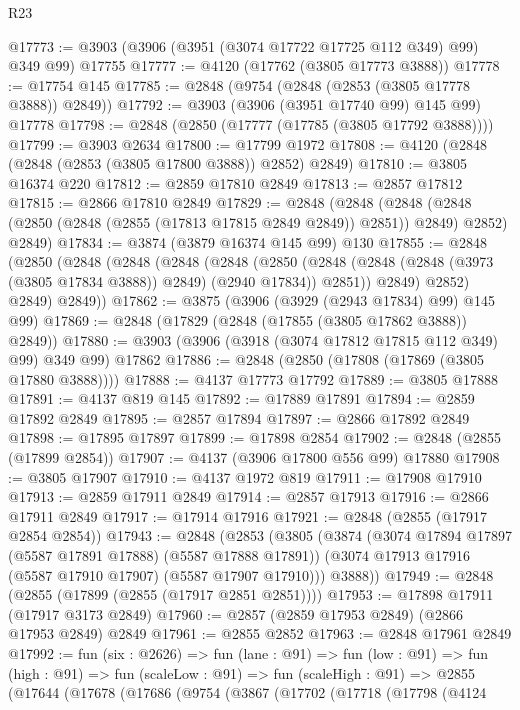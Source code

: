\begin{lexlean}{R23}
\begin{coremodule}
@17773 := @3903 (@3906 (@3951 (@3074 @17722 @17725 @112 @349) @99) @349 @99) @17755
@17777 := @4120 (@17762 (@3805 @17773 @3888))
@17778 := @17754 @145
@17785 := @2848 (@9754 (@2848 (@2853 (@3805 @17778 @3888)) @2849))
@17792 := @3903 (@3906 (@3951 @17740 @99) @145 @99) @17778
@17798 := @2848 (@2850 (@17777 (@17785 (@3805 @17792 @3888))))
@17799 := @3903 @2634
@17800 := @17799 @1972
@17808 := @4120 (@2848 (@2848 (@2853 (@3805 @17800 @3888)) @2852) @2849)
@17810 := @3805 @16374 @220
@17812 := @2859 @17810 @2849
@17813 := @2857 @17812
@17815 := @2866 @17810 @2849
@17829 := @2848
    (@2848
      (@2848 (@2848 (@2850 (@2848 (@2855 (@17813 @17815 @2849 @2849)) @2851)) @2849) @2852)
      @2849)
@17834 := @3874 (@3879 @16374 @145 @99) @130
@17855 := @2848
    (@2850
      (@2848
        (@2848
          (@2848
            (@2848
              (@2850
                (@2848 (@2848 (@2848 (@3973 (@3805 @17834 @3888)) @2849) (@2940 @17834)) @2851))
              @2849)
            @2852)
          @2849)
        @2849))
@17862 := @3875 (@3906 (@3929 (@2943 @17834) @99) @145 @99)
@17869 := @2848 (@17829 (@2848 (@17855 (@3805 @17862 @3888)) @2849))
@17880 := @3903 (@3906 (@3918 (@3074 @17812 @17815 @112 @349) @99) @349 @99) @17862
@17886 := @2848 (@2850 (@17808 (@17869 (@3805 @17880 @3888))))
@17888 := @4137 @17773 @17792
@17889 := @3805 @17888
@17891 := @4137 @819 @145
@17892 := @17889 @17891
@17894 := @2859 @17892 @2849
@17895 := @2857 @17894
@17897 := @2866 @17892 @2849
@17898 := @17895 @17897
@17899 := @17898 @2854
@17902 := @2848 (@2855 (@17899 @2854))
@17907 := @4137 (@3906 @17800 @556 @99) @17880
@17908 := @3805 @17907
@17910 := @4137 @1972 @819
@17911 := @17908 @17910
@17913 := @2859 @17911 @2849
@17914 := @2857 @17913
@17916 := @2866 @17911 @2849
@17917 := @17914 @17916
@17921 := @2848 (@2855 (@17917 @2854 @2854))
@17943 := @2848
    (@2853
      (@3805
        (@3874
          (@3074 @17894 @17897 (@5587 @17891 @17888) (@5587 @17888 @17891))
          (@3074 @17913 @17916 (@5587 @17910 @17907) (@5587 @17907 @17910)))
        @3888))
@17949 := @2848 (@2855 (@17899 (@2855 (@17917 @2851 @2851))))
@17953 := @17898 @17911 (@17917 @3173 @2849)
@17960 := @2857 (@2859 @17953 @2849) (@2866 @17953 @2849) @2849
@17961 := @2855 @2852
@17963 := @2848 @17961 @2849
@17992 := fun (six : @2626) =>
  fun (lane : @91) =>
  fun (low : @91) =>
  fun (high : @91) =>
  fun (scaleLow : @91) =>
  fun (scaleHigh : @91) =>
  @2855
    (@17644
      (@17678
        (@17686
          (@9754
            (@3867
              (@17702
                (@17718
                  (@17798
                    (@4124

\end{coremodule}
\end{lexlean}
